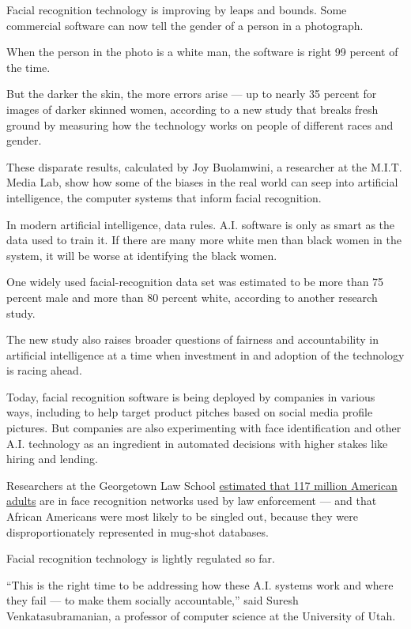 Facial recognition technology is improving by leaps and bounds. Some
commercial software can now tell the gender of a person in a photograph.

When the person in the photo is a white man, the software is right 99
percent of the time.

But the darker the skin, the more errors arise --- up to nearly 35
percent for images of darker skinned women, according to a new study
that breaks fresh ground by measuring how the technology works on people
of different races and gender.

These disparate results, calculated by Joy Buolamwini, a researcher at
the M.I.T. Media Lab, show how some of the biases in the real world can
seep into artificial intelligence, the computer systems that inform
facial recognition.

In modern artificial intelligence, data rules. A.I. software is only as
smart as the data used to train it. If there are many more white men
than black women in the system, it will be worse at identifying the
black women.

One widely used facial-recognition data set was estimated to be more
than 75 percent male and more than 80 percent white, according to
another research study.

The new study also raises broader questions of fairness and
accountability in artificial intelligence at a time when investment in
and adoption of the technology is racing ahead.

Today, facial recognition software is being deployed by companies in
various ways, including to help target product pitches based on social
media profile pictures. But companies are also experimenting with face
identification and other A.I. technology as an ingredient in automated
decisions with higher stakes like hiring and lending.

Researchers at the Georgetown Law School
\href{https://www.perpetuallineup.org/}{estimated that 117 million
American adults} are in face recognition networks used by law
enforcement --- and that African Americans were most likely to be
singled out, because they were disproportionately represented in
mug-shot databases.

Facial recognition technology is lightly regulated so far.

``This is the right time to be addressing how these A.I. systems work
and where they fail --- to make them socially accountable,'' said Suresh
Venkatasubramanian, a professor of computer science at the University of
Utah.

